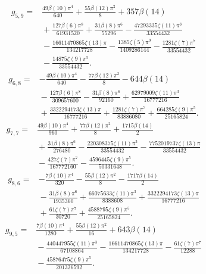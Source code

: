 \begin{align*}g_{5,9}={}&\frac{49 \beta(10) \pi^{4}}{640}+\frac{55 \beta(12) \pi^{2}}{8}+357 \beta(14)\\
&{}+\frac{127 \beta(6) \pi^{8}}{61931520}+\frac{31 \beta(8) \pi^{6}}{55296}- \frac{47293335 \zeta(11) \pi^{3}}{33554432}\\
&{}- \frac{16611470865 \zeta(13) \pi}{134217728}- \frac{1385 \zeta(5) \pi^{9}}{1409286144}- \frac{1281 \zeta(7) \pi^{7}}{33554432}\\
&{}- \frac{14875 \zeta(9) \pi^{5}}{33554432}.\end{align*}
\begin{align*}g_{6,8}={}&- \frac{49 \beta(10) \pi^{4}}{640}- \frac{77 \beta(12) \pi^{2}}{8}- 644 \beta(14)\\
&{}- \frac{127 \beta(6) \pi^{8}}{309657600}- \frac{31 \beta(8) \pi^{6}}{92160}+\frac{62979009 \zeta(11) \pi^{3}}{16777216}\\
&{}+\frac{3322294173 \zeta(13) \pi}{16777216}+\frac{1281 \zeta(7) \pi^{7}}{83886080}+\frac{664285 \zeta(9) \pi^{5}}{25165824}.\end{align*}
\begin{align*}g_{7,7}={}&\frac{49 \beta(10) \pi^{4}}{960}+\frac{77 \beta(12) \pi^{2}}{8}+\frac{1715 \beta(14)}{2}\\
&{}+\frac{31 \beta(8) \pi^{6}}{276480}- \frac{220308375 \zeta(11) \pi^{3}}{33554432}- \frac{7752019737 \zeta(13) \pi}{33554432}\\
&{}- \frac{427 \zeta(7) \pi^{7}}{167772160}- \frac{4596445 \zeta(9) \pi^{5}}{50331648}.\end{align*}
\begin{align*}g_{8,6}={}&- \frac{7 \beta(10) \pi^{4}}{320}- \frac{55 \beta(12) \pi^{2}}{8}- \frac{1717 \beta(14)}{2}\\
&{}- \frac{31 \beta(8) \pi^{6}}{1935360}+\frac{66075633 \zeta(11) \pi^{3}}{8388608}+\frac{3322294173 \zeta(13) \pi}{16777216}\\
&{}+\frac{61 \zeta(7) \pi^{7}}{30720}+\frac{4588795 \zeta(9) \pi^{5}}{25165824}.\end{align*}
\begin{align*}g_{9,5}={}&\frac{7 \beta(10) \pi^{4}}{1280}+\frac{55 \beta(12) \pi^{2}}{16}+643 \beta(14)\\
&{}- \frac{440447955 \zeta(11) \pi^{3}}{67108864}- \frac{16611470865 \zeta(13) \pi}{134217728}- \frac{61 \zeta(7) \pi^{7}}{12288}\\
&{}- \frac{45876475 \zeta(9) \pi^{5}}{201326592}.\end{align*}
